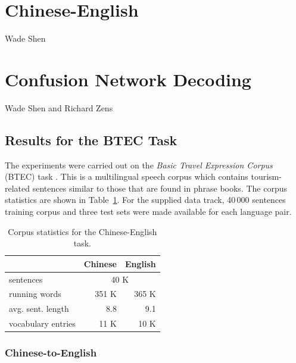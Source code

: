 \documentclass[10pt]{report}
\theoremstyle{plain}
\begin{document}
{{}  %


\section{Chinese-English}
{\sc Wade Shen}

\section{Confusion Network Decoding}
{\sc Wade Shen and Richard Zens}


\subsection{Results for the BTEC Task}

The experiments were carried out on the {\it Basic Travel Expression Corpus} (BTEC) task \cite{takezawa02}. 
This is a multilingual speech corpus which contains tourism-related sentences similar to those that are found in phrase books.
The corpus statistics are shown in Table~\ref{tab-corpus}.
For the supplied data track, 40\,000 sentences training corpus and three test sets were made available for each language pair.

\begin{table}
\begin{center}
\caption{Corpus statistics for the Chinese-English task.} \label{tab-corpus}
\begin{tabular}{|l|r|r|}
\hline
& Chinese & English \\
\hline
sentences & \multicolumn{2}{c|}{40 K} \\ \cline{2-3}
running words & 351 K  &  365 K \\
avg. sent. length& 8.8& 9.1 \\
vocabulary entries& 11 K & 10 K \\
\hline
\end{tabular}
\end{center}
\end{table}



\subsubsection{Chinese-to-English}

}
\end{document}
